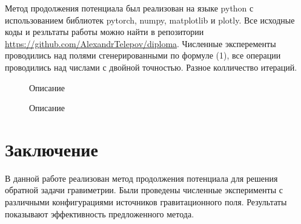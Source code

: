 \documentclass[12pt]{article}
\begin{document}
Метод продолжения потенциала был реализован на языке python с использованием библиотек pytorch, numpy, matplotlib и plotly. Все исходные коды и резльтаты работы можно найти в репозитории \href{https://github.com/AlexandrTelepov/diploma}{https://github.com/AlexandrTelepov/diploma}.
Численные эксперементы проводились над полями сгенерированными по формуле (1), все операции проводились над числами с двойной точностью.
Разное колличество итераций.

\begin{figure}[h]
\begin{minipage}[h]{0.49\linewidth}
\caption{Описание}
\label{fig:image}
\end{minipage}
\hfill
\begin{minipage}[h]{0.49\linewidth}
\caption{Описание}
\label{fig:image}
\end{minipage}
\end{figure}

\section
{Заключение}
В данной работе реализован метод продолжения потенциала для решения обратной задачи гравиметрии. Были проведены численные эксперименты с различными конфигурациями источников гравитационного поля. Результаты показывают эффективность предложенного метода.
\clearpage



\end{document}
